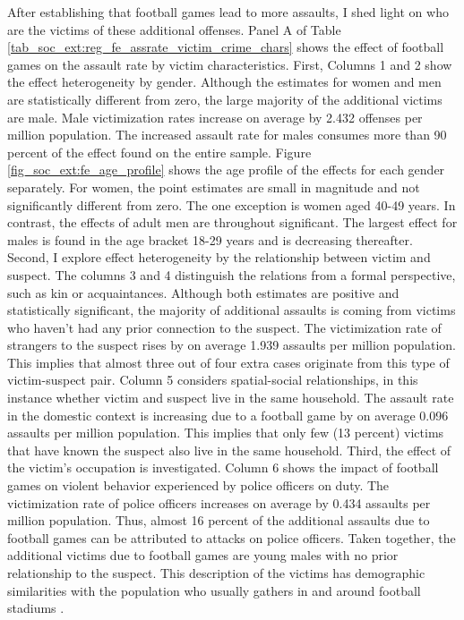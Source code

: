 

After establishing that football games lead to more assaults, I shed light on who are the victims of these additional offenses. Panel A of Table \ref{tab_soc_ext:reg_fe_assrate_victim_crime_chars} shows the effect of football games on the assault rate by victim characteristics. First, Columns 1 and 2 show the effect heterogeneity by gender. Although the estimates for women and men are statistically different from zero, the large majority of the additional victims are male. Male victimization rates increase on average by 2.432 offenses per million population. The increased assault rate for males consumes more than 90 percent of the effect found on the entire sample. Figure \ref{fig_soc_ext:fe_age_profile} shows the age profile of the effects for each gender separately. For women, the point estimates are small in magnitude and not significantly different from zero. The one exception is women aged 40-49 years. In contrast, the effects of adult men are throughout significant. The largest effect for males is found in the age bracket 18-29 years and is decreasing thereafter. Second, I explore effect heterogeneity by the relationship between victim and suspect. The columns 3 and 4 distinguish the relations from a formal perspective, such as kin or acquaintances. Although both estimates are positive and statistically significant, the majority of additional assaults is coming from victims who haven't had any prior connection to the suspect. The victimization rate of strangers to the suspect rises by on average 1.939 assaults per million population. This implies that almost three out of four extra cases originate from this type of victim-suspect pair. Column 5 considers spatial-social relationships, in this instance whether victim and suspect live in the same household. The assault rate in the domestic context is increasing due to a football game by on average 0.096 assaults per million population. This implies that only few (13 percent) victims that have known the suspect also live in the same household. Third, the effect of the victim's occupation is investigated. Column 6 shows the impact of football games on violent behavior experienced by police officers on duty. The victimization rate of police officers increases on average by 0.434 assaults per million population. Thus, almost 16 percent of the additional assaults due to football games can be attributed to attacks on police officers. Taken together, the additional victims due to football games are young males with no prior relationship to the suspect. This description of the victims has demographic similarities with the population who usually gathers in and around football stadiums \citep{pwc2016}.

